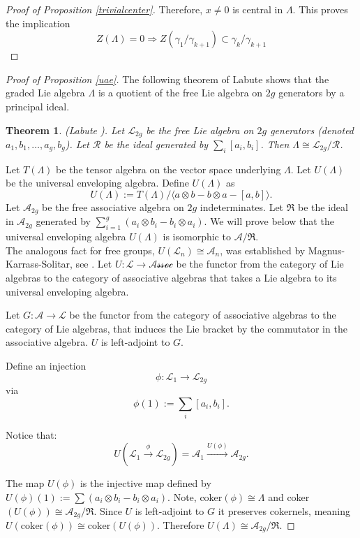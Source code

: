 \documentclass[a4paper]{amsproc}
\theoremstyle{TheoremNum}
\theoremstyle{Theorembold}
\newtheorem{thm}{Theorem}[section]
\theoremstyle{TheoremboldDef}
\theoremstyle{TheoremboldRem}
\theoremstyle{TheoremboldRem}
\begin{document}
\begin{proof}[Proof of Proposition \ref{trivialcenter}\nopunct]
 Therefore, $x\neq 0$ is central in $\Lambda$. This proves the implication
\begin{equation} \label{centerlessimplies} Z(\Lambda)=0\Rightarrow Z(\gamma_1/\gamma_{k+1}) \subset\gamma_{k}/\gamma_{k+1}\end{equation}  \end{proof} 

\begin{proof}[Proof of Proposition \ref{uae}\nopunct] The following theorem of Labute shows that the graded Lie algebra $\Lambda$ is a quotient of the free Lie algebra on $2g$ generators by a principal ideal. \begin{thm} (Labute \cite{Labute1970}).
Let $\mathcal{L}_{2g}$ be the free Lie algebra on $2g$ generators (denoted $a_1,b_1,\dots,a_g,b_g$). Let $\mathcal{R}$ be the ideal generated by $\sum_i[a_i,b_i]$. Then $\Lambda\cong\mathcal{L}_{2g}/\mathcal{R}$.
\end{thm}

 Let $T(\Lambda)$ be the tensor algebra on the vector space underlying $\Lambda$. Let $U(\Lambda)$ be the universal enveloping algebra. Define $U(\Lambda)$ as \[U(\Lambda):= T(\Lambda)/\langle a\otimes b-b\otimes a -[a,b]\rangle.\] Let $\mathcal{A}_{2g}$ be the free associative algebra on $2g$ indeterminates. Let $\mathfrak{R}$ be the ideal in $\mathcal{A}_{2g}$ generated by $\sum_{i=1}^g(a_i\otimes b_i-b_i\otimes a_i)$.  We will prove below that the universal enveloping algebra $U(\Lambda)$ is isomorphic to $\mathcal{A}/\mathfrak{R}$.\\
 
The analogous fact for free groups, $U(\mathcal{L}_n)\cong\mathcal{A}_n$, was established by Magnus-Karrass-Solitar, see \cite[pp.347 ex.5]{MKS}. Let $U:\mathcal{L}\to \mathcal{Assoc}$ be the functor from the category of Lie algebras to the category of associative algebras that takes a Lie algebra to its universal enveloping algebra. 

Let $G: \mathcal{A}\to \mathcal{L}$ be the functor from the category of associative algebras to the category of Lie algebras, that induces the Lie bracket by the commutator in the associative algebra. $U$ is left-adjoint to $G$.

Define an injection
\[\phi:\mathcal{L}_1\to\mathcal{L}_{2g}\]
via\[\phi(1):=\sum_i[a_i,b_i].\]

Notice that: \[U(\mathcal{L}_1\stackrel{\phi}{\longrightarrow}\mathcal{L}_{2g})=\mathcal{A}_1\stackrel{U(\phi)}{\longrightarrow}\mathcal{A}_{2g}.\]

The map $U(\phi)$ is the injective map defined by $U(\phi)(1):= \sum(a_i\otimes b_i-b_i\otimes a_i)$. Note, coker$(\phi)\cong\Lambda$ and coker$(U(\phi))\cong\mathcal{A}_{2g}/\mathfrak{R}$. Since $U$ is left-adjoint to $G$ it preserves cokernels, meaning $U(\text{coker}(\phi))\cong \text{coker}(U(\phi))$. Therefore $U(\Lambda)\cong \mathcal{A}_{2g}/\mathfrak{R}$.\end{proof}
\end{document}
